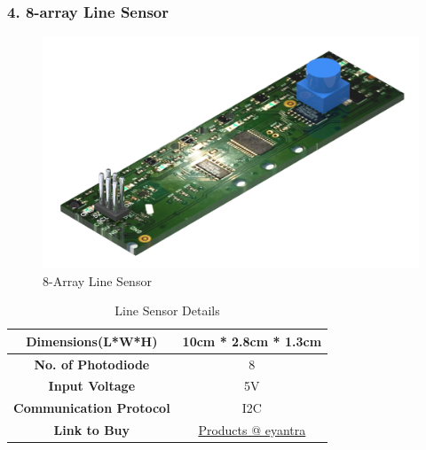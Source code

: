 \documentclass[12pt,a4paper,oneside]{book}
\begin{document}
			\subsubsection*{4. 8-array Line Sensor}
				\begin{figure}[H]
					\centering					
					\includegraphics[scale=1]{LINE SENSOR FULL}
					\caption{8-Array Line Sensor}	 
				\end{figure}
				\begin{table}[H]
					\centering
					\def\arraystretch{1.5}
					\caption{Line Sensor Details}
					\vspace{0.5cm}
					\begin{tabular}{|c||c|}
					\hline
						\textbf{Dimensions(L*W*H)} & 10cm * 2.8cm * 1.3cm\\\hline
						\textbf{No. of Photodiode} & 8\\\hline
						\textbf{Input Voltage} & 5V\\\hline
						\textbf{Communication Protocol} & I2C\\\hline
						\textbf{Link to Buy} & \href{https://products.e-yantra.org/eylfa/}{Products @ eyantra}\\\hline
					\end{tabular}
				\end{table}
				\pagebreak
				
\end{document}
